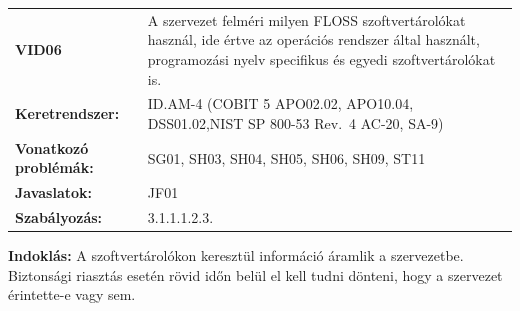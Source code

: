 \documentclass[12pt,magyar,a4paper,oneside]{scrreprt}
\begin{document}
\begin{longtable}[]{@{}ll@{}}
\toprule
\endhead
\begin{minipage}[t]{0.16\columnwidth}\raggedright
\textbf{VID06}\strut
\end{minipage} & \begin{minipage}[t]{0.79\columnwidth}\raggedright
A szervezet felméri milyen FLOSS szoftvertárolókat használ, ide értve az
operációs rendszer által használt, programozási nyelv specifikus és
egyedi szoftvertárolókat is.\strut
\end{minipage}\tabularnewline
\begin{minipage}[t]{0.16\columnwidth}\raggedright
\textbf{Keretrendszer:}\strut
\end{minipage} & \begin{minipage}[t]{0.79\columnwidth}\raggedright
ID.AM-4 (COBIT 5 APO02.02, APO10.04, DSS01.02,NIST SP 800-53 Rev.~4
AC-20, SA-9)\strut
\end{minipage}\tabularnewline
\begin{minipage}[t]{0.16\columnwidth}\raggedright
\textbf{Vonatkozó problémák:}\strut
\end{minipage} & \begin{minipage}[t]{0.79\columnwidth}\raggedright
SG01, SH03, SH04, SH05, SH06, SH09, ST11\strut
\end{minipage}\tabularnewline
\begin{minipage}[t]{0.16\columnwidth}\raggedright
\textbf{Javaslatok:}\strut
\end{minipage} & \begin{minipage}[t]{0.79\columnwidth}\raggedright
JF01\strut
\end{minipage}\tabularnewline
\begin{minipage}[t]{0.16\columnwidth}\raggedright
\textbf{Szabályozás:}\strut
\end{minipage} & \begin{minipage}[t]{0.79\columnwidth}\raggedright
3.1.1.1.2.3.\strut
\end{minipage}\tabularnewline
\bottomrule
\end{longtable}

\textbf{Indoklás: } A szoftvertárolókon keresztül információ áramlik a
szervezetbe. Biztonsági riasztás esetén rövid időn belül el kell tudni
dönteni, hogy a szervezet érintette-e vagy sem.
\end{document}
